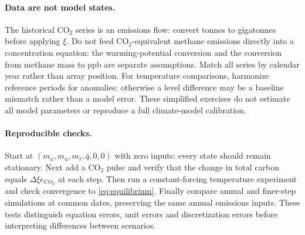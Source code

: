 \documentclass[11pt,a4paper]{article}
\begin{document}
\paragraph{Data are not model states.}
The historical CO$_2$ series is an emissions flow: convert tonnes
to gigatonnes before applying $\xi$. Do not feed CO$_2$-equivalent methane
emissions directly into a concentration equation: the warming-potential
conversion and the conversion from methane mass to ppb are separate
assumptions. Match all series by calendar year rather than array position.
For temperature comparisons, harmonize reference periods for anomalies;
otherwise a level difference may be a baseline mismatch rather than
a model error. These simplified exercises do not estimate all model
parameters or reproduce a full climate-model calibration.

\paragraph{Reproducible checks.}
Start at $(m_a,m_u,m_\ell,\bar q,0,0)$ with zero inputs: every state should
remain stationary. Next add a CO$_2$ pulse and verify that the change in
total carbon equals $\Delta\xi e_{\mathrm{CO_2}}$ at each step.
Then run a constant-forcing temperature experiment and check convergence
to \eqref{eq:equilibrium}. Finally compare annual and finer-step simulations
at common dates, preserving the same annual emissions inputs.
These tests distinguish equation errors, unit errors and discretization
errors before interpreting differences between scenarios.
\end{document}
